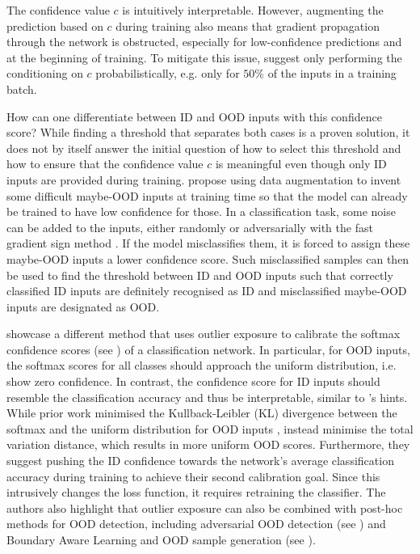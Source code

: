 The confidence value $c$ is intuitively interpretable. However, augmenting the prediction based on $c$ during training also means that gradient propagation through the network is obstructed, especially for low-confidence predictions and at the beginning of training. To mitigate this issue, \citeauthor{learning-ood-confidence-2018} suggest only performing the conditioning on $c$ probabilistically, e.g. only for $50\%$ of the inputs in a training batch.

\newpar How can one differentiate between ID and OOD inputs with this confidence score? While finding a threshold that separates both cases is a proven solution, it does not by itself answer the initial question of how to select this threshold and how to ensure that the confidence value $c$ is meaningful even though only ID inputs are provided during training. \citeauthor{learning-ood-confidence-2018} propose using data augmentation to invent some difficult maybe-OOD inputs at training time so that the model can already be trained to have low confidence for those. In a classification task, some noise can be added to the inputs, either randomly or adversarially with the fast gradient sign method \cite{fast-gradient-2014}. If the model misclassifies them, it is forced to assign these maybe-OOD inputs a lower confidence score. Such misclassified samples can then be used to find the threshold between ID and OOD inputs such that correctly classified ID inputs are definitely recognised as ID and misclassified maybe-OOD inputs are designated as OOD.

\newpar \textcite{ood-exposure-confidence-2021} showcase a different method that uses outlier exposure \cite{ood-exposure-2018} to calibrate the softmax confidence scores (see ) of a classification network. In particular, for OOD inputs, the softmax scores for all classes should approach the uniform distribution, i.e. show zero confidence. In contrast, the confidence score for ID inputs should resemble the classification accuracy and thus be interpretable, similar to \citeauthor{learning-ood-confidence-2018}'s hints. While prior work minimised the Kullback-Leibler (KL) divergence \cite{kl-divergence-1951} between the softmax and the uniform distribution for OOD inputs \cite{ood-exposure-2018}, \citeauthor{ood-exposure-confidence-2021} instead minimise the total variation distance, which results in more uniform OOD scores. Furthermore, they suggest pushing the ID confidence towards the network's average classification accuracy during training to achieve their second calibration goal. Since this intrusively changes the loss function, it requires retraining the classifier. The authors also highlight that outlier exposure can also be combined with post-hoc methods for OOD detection, including adversarial OOD detection (see ) and Boundary Aware Learning and OOD sample generation (see ).


